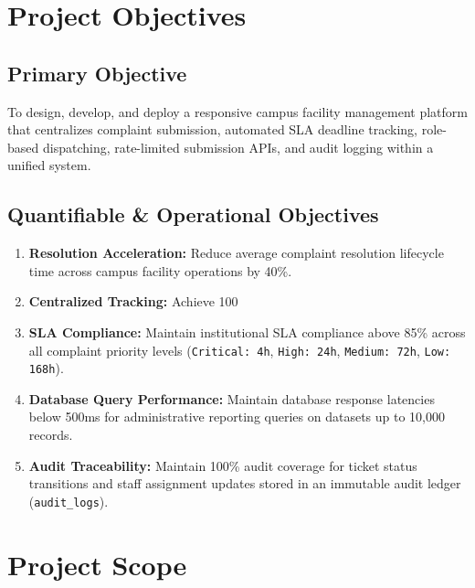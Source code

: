 \documentclass[12pt, a4paper]{article}
\begin{document}
\section{Project Objectives}

\subsection{Primary Objective}
To design, develop, and deploy a responsive campus facility management platform that centralizes complaint submission, automated SLA deadline tracking, role-based dispatching, rate-limited submission APIs, and audit logging within a unified system.

\subsection{Quantifiable \& Operational Objectives}
\begin{enumerate}
    \item \textbf{Resolution Acceleration:} Reduce average complaint resolution lifecycle time across campus facility operations by 40\%.
    \item \textbf{Centralized Tracking:} Achieve 100%
    \item \textbf{SLA Compliance:} Maintain institutional SLA compliance above 85\% across all complaint priority levels (\texttt{Critical: 4h}, \texttt{High: 24h}, \texttt{Medium: 72h}, \texttt{Low: 168h}).
    \item \textbf{Database Query Performance:} Maintain database response latencies below 500ms for administrative reporting queries on datasets up to 10,000 records.
    \item \textbf{Audit Traceability:} Maintain 100\% audit coverage for ticket status transitions and staff assignment updates stored in an immutable audit ledger (\texttt{audit\_logs}).
\end{enumerate}

\section{Project Scope}
\end{document}
